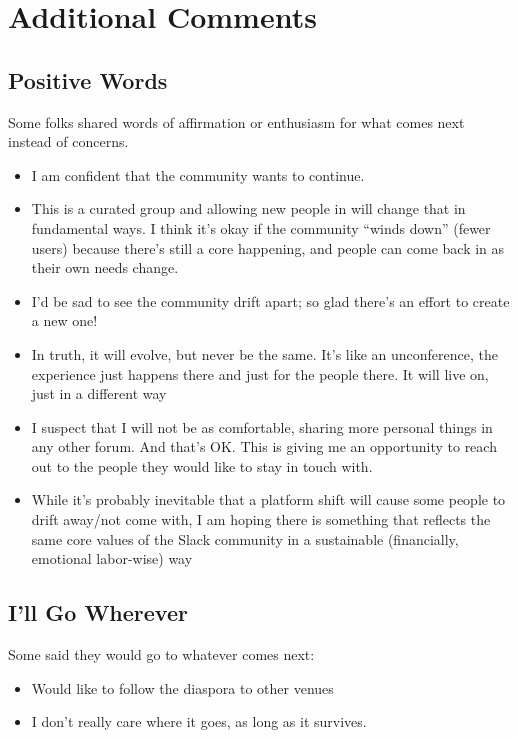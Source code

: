 \documentclass[
]{book}
\providecommand{\tightlist}{%
  \setlength{\itemsep}{0pt}\setlength{\parskip}{0pt}}
\begin{document}
\section{Additional Comments}\label{additional-comments}

\subsection{Positive Words}\label{positive-words}

Some folks shared words of affirmation or enthusiasm for what comes next instead of concerns.

\begin{itemize}
\tightlist
\item
  I am confident that the community wants to continue.
\item
  This is a curated group and allowing new people in will change that in fundamental ways. I think it's okay if the community ``winds down'' (fewer users) because there's still a core happening, and people can come back in as their own needs change.
\item
  I'd be sad to see the community drift apart; so glad there's an effort to create a new one!
\item
  In truth, it will evolve, but never be the same. It's like an unconference, the experience just happens there and just for the people there. It will live on, just in a different way
\item
  I suspect that I will not be as comfortable, sharing more personal things in any other forum. And that's OK. This is giving me an opportunity to reach out to the people they would like to stay in touch with.
\item
  While it's probably inevitable that a platform shift will cause some people to drift away/not come with, I am hoping there is something that reflects the same core values of the Slack community in a sustainable (financially, emotional labor-wise) way
\end{itemize}

\subsection{I'll Go Wherever}\label{ill-go-wherever}

Some said they would go to whatever comes next:

\begin{itemize}
\tightlist
\item
  Would like to follow the diaspora to other venues
\item
  I don't really care where it goes, as long as it survives.
\end{itemize}
\end{document}
